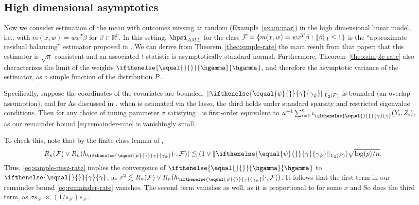 \documentclass[aos,submission]{imsart}
\theoremstyle{plain}
\theoremstyle{remark}
\newcommand{\influence}{\iota}
\newcommand{\riesz}[1][]{\ifthenelse{\equal{#1}{}}{\gamma}{\gamma_{{#1}}}}
\newcommand{\hriesz}[1][]{\ifthenelse{\equal{#1}{}}{\hgamma}{\hgamma_{{#1}}}}
\DeclarePairedDelimiter\norm{\lVert}{\rVert}
\DeclarePairedDelimiter\set{\{}{\}}
\newcommand{\R}{\mathbb{R}}
\newcommand{\F}{\mathcal{F}}
\begin{document}
\subsection{High dimensional asymptotics}
\label{sec:high-dim-asymptotics}
Now we consider estimation of the mean with outcomes missing at random (Example~\ref{exam:mar}) in the high dimensional linear model,
i.e., with $m(x,w)=wx^T\beta$ for $\beta \in \R^p$. In this setting, $\hpsi_{AML}$ for the class $\F = \set{m(x,w)=wx^T\beta : \norm{\beta}_{1} \le 1}$
is the ``approximate residual balancing'' estimator proposed in \citet{athey2016approximate}. We can derive from 
Theorem~\ref{theo:simple-rate} the main result from that paper: that this estimator is $\sqrt{n}$-consistent 
and an associated $t$-statistic is asymptotically standard normal.
Furthermore, Theorem~\ref{theo:simple-rate} also characterizes the limit of the weights $\hriesz$, and therefore the asymptotic variance of the estimator,
as a simple function of the distribution $\P$.


Specifically, suppose the coordinates of the covariates are bounded, 
$\norm{\riesz[\psi]}_{L_2(\P)}$ is bounded  (an overlap assumption), 
and \smash{$\norm{\hat{\beta} - \beta}_1 = O_P(s_\F)$} for \smash{$s_\F \ll 1/\sqrt{\log(p)}$.}
As discussed in \citet{athey2016approximate}, when \smash{$\hat \beta$} is estimated via the lasso, 
the third holds under standard sparsity and restricted eigenvalue conditions.
Then for any choice of tuning parameter $\sigma$ satisfying \smash{$\sqrt{\log(p)} \ll \sigma \ll 1/s_\F$},
  is first-order equivalent to $n^{-1}\sum_{i=1}^n \influence_{\tilde\riesz}(Y_i,Z_i)$,
as our remainder bound \eqref{eq:remainder-rate} is vanishingly small.


To check this, note that by the finite class lemma of \citet[Lemma 5.2]{massart2000some},
\[ R_n(\F) \vee R_n(h_{\riesz[\psi]}(\cdot,\F)) \lesssim (1 \vee \norm{\riesz[\psi]}_{L_2(\P)})\sqrt{\log(p)/n}. \]
Thus, \eqref{eq:sample-riesz-rate} implies the convergence of $\hriesz$ to $\tilde\riesz$,
as $r^2 \lesssim R_n(\F) \vee R_n(h_{\riesz[\psi]}(\cdot,\F))$. 
It follows that the first term in our remainder bound \eqref{eq:remainder-rate} vanishes.
The second term vanishes as well,
as it is proportional to \smash{$\sqrt{n} s_\F \cdot \phi(x) \ll \sqrt{n/\log(p)} \cdot \phi(x)$} for some $x$ 
and \smash{$\phi(x) \lesssim R_n(h_{\riesz[\psi]}(\cdot,\F)) \lesssim \sqrt{\log(p)/n}$.}
So does the third term, as $\sigma s_\F \ll (1/s_\F) s_\F$.
\end{document}

